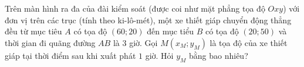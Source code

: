 \begin{ex}%
	Trên màn hình ra đa của đài kiểm soát (được coi như mặt phẳng tọa độ $Oxy$) với đơn vị trên các trục (tính theo ki-lô-mét), một xe thiết giáp chuyển động thẳng đều từ mục tiêu $A$ có tọa độ $(60;20)$ đến mục tiểu $B$ có tọa độ $(20;50)$ và thời gian đi quãng đường $AB$ là $3$ giờ. Gọi $M(x_M;y_M)$ là tọa độ của xe thiết giáp tại thời điểm sau khi xuất phát $1$ giờ. Hỏi $y_M$ bằng bao nhiêu? \\
\end{ex}


